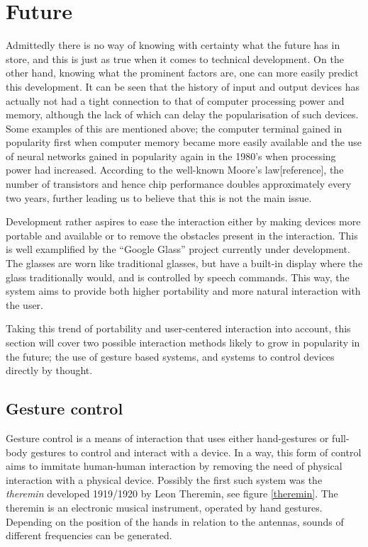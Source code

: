 
\section{Future}
\label{future}
Admittedly there is no way of knowing with certainty what the future has in store, and this is just as true when it comes to technical development. On the other hand, knowing what the prominent factors are, one can more easily predict this development. It can be seen that the history of input and output devices has actually not had a tight connection to that of computer processing power and memory, although the lack of which can delay the popularisation of such devices. Some examples of this are mentioned above; the computer terminal gained in popularity first when computer memory became more easily available and the use of neural networks gained in popularity again in the 1980's when processing power had increased. According to the well-known Moore's law[reference], the number of transistors and hence chip performance doubles approximately every two years, further leading us to believe that this is not the main issue.

Development rather aspires to ease the interaction either by making devices more portable and available or to remove the obstacles present in the interaction. This is well examplified by the ``Google Glass'' project currently under development. The glasses are worn like traditional glasses, but have a built-in display where the glass traditionally would, and is controlled by speech commands. This way, the system aims to provide both higher portability and more natural interaction with the user.

Taking this trend of portability and user-centered interaction into account, this section will cover two possible interaction methods likely to grow in popularity in the future; the use of gesture based systems, and systems to control devices directly by thought. 


\subsection{Gesture control}
Gesture control is a means of interaction that uses either hand-gestures or full-body gestures to control and interact with a device. In a way, this form of control aims to immitate human-human interaction by removing the need of physical interaction with a physical device. Possibly the first such system was the \emph{theremin} developed 1919/1920 by Leon Theremin, see figure \ref{theremin}. The theremin is an electronic musical instrument, operated by hand gestures. Depending on the position of the hands in relation to the antennas, sounds of different frequencies can be generated\cite{thereminpatent}.

